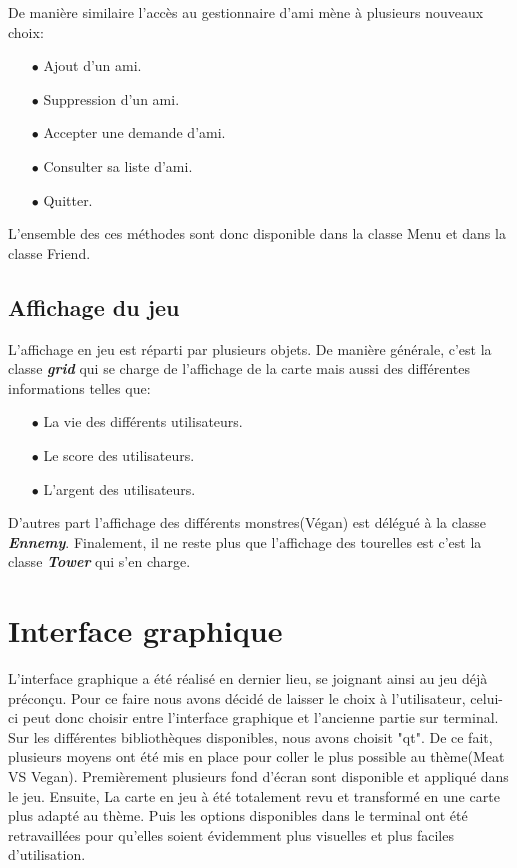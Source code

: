 \documentclass[12pt,a4paper]{article}
\begin{document}
De manière similaire l'accès au gestionnaire d'ami mène à plusieurs nouveaux choix:
\begin{itemize}
\item[$\bullet$] Ajout d'un ami.
\item[$\bullet$] Suppression d'un ami.
\item[$\bullet$] Accepter une demande d'ami.
\item[$\bullet$] Consulter sa liste d'ami.
\item[$\bullet$] Quitter.
\end{itemize}
L'ensemble des ces méthodes sont donc disponible dans la classe Menu et dans la classe Friend.
\newpage
\subsection{Affichage du jeu}
L'affichage en jeu est réparti par plusieurs objets. De manière générale, c'est la classe \textit{\textbf{grid}} qui se charge de l'affichage de la carte mais aussi des différentes informations telles que:
\begin{itemize}
\item[$\bullet$] La vie des différents utilisateurs. 
\item[$\bullet$] Le score des utilisateurs. 
\item[$\bullet$] L'argent des utilisateurs.
\end{itemize}
D'autres part l'affichage des différents monstres(Végan) est délégué à la classe \textit{\textbf{Ennemy}}. Finalement, il ne reste plus que l'affichage des tourelles  est c'est la classe \textit{\textbf{Tower}} qui s'en charge.

\newpage
\section{Interface graphique}
L'interface graphique a été réalisé en dernier lieu, se joignant ainsi au jeu déjà préconçu. Pour ce faire nous avons décidé de laisser le choix à l'utilisateur, celui-ci peut donc choisir entre l'interface graphique et l'ancienne partie sur terminal. Sur les différentes bibliothèques disponibles, nous avons choisit "qt". De ce fait, plusieurs moyens ont été mis en place pour coller le plus possible au thème(Meat VS Vegan). Premièrement plusieurs fond d'écran sont disponible et appliqué dans le jeu. Ensuite, La carte en jeu à été totalement revu et transformé en une carte plus adapté au thème. Puis les options disponibles dans le terminal ont été retravaillées pour qu’elles soient évidemment plus visuelles et plus faciles d’utilisation.
\end{document}
